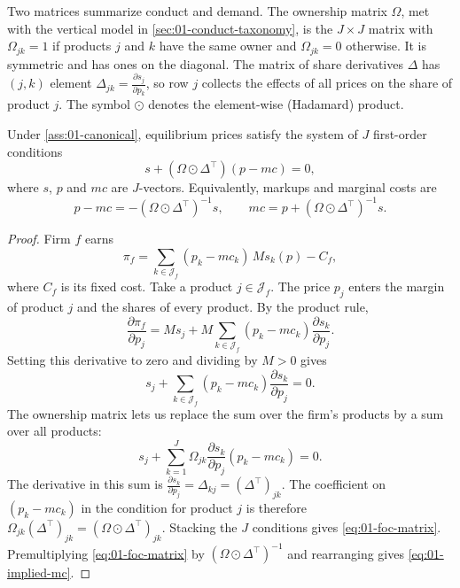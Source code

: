 Two matrices summarize conduct and demand. The ownership matrix $\Omega$, met with the vertical model in
\cref{sec:01-conduct-taxonomy}, is the $J \times J$ matrix with $\Omega_{jk} = 1$ if products $j$ and $k$ have the same owner and $\Omega_{jk} = 0$ otherwise. It is
symmetric and has ones on the diagonal. The matrix of share derivatives $\Delta$ has $(j, k)$ element
$\Delta_{jk} = \frac{\partial s_j}{\partial p_k}$, so row $j$ collects the effects of all prices on the
share of product $j$. The symbol $\odot$ denotes the element-wise (Hadamard) product.

\begin{proposition}\label{prop:01-multiproduct-foc}
Under \cref{ass:01-canonical}, equilibrium prices satisfy the system of $J$ first-order conditions
\begin{equation}\label{eq:01-foc-matrix}
  s + (\Omega \odot \Delta^\top)(p - mc) = 0,
\end{equation}
where $s$, $p$ and $mc$ are $J$-vectors. Equivalently, markups and marginal costs are
\begin{equation}\label{eq:01-implied-mc}
  p - mc = -(\Omega \odot \Delta^\top)^{-1} s,
  \qquad
  mc = p + (\Omega \odot \Delta^\top)^{-1} s .
\end{equation}
\end{proposition}

\begin{proof}
Firm $f$ earns
\[
  \pi_f = \sum_{k \in \mathcal{J}_f} (p_k - mc_k)\, M s_k(p) - C_f ,
\]
where $C_f$ is its fixed cost. Take a product $j \in \mathcal{J}_f$. The price $p_j$ enters the margin of
product $j$ and the shares of every product. By the product rule,
\[
  \frac{\partial \pi_f}{\partial p_j}
  = M s_j + M \sum_{k \in \mathcal{J}_f} (p_k - mc_k) \frac{\partial s_k}{\partial p_j} .
\]
Setting this derivative to zero and dividing by $M > 0$ gives
\[
  s_j + \sum_{k \in \mathcal{J}_f} (p_k - mc_k) \frac{\partial s_k}{\partial p_j} = 0 .
\]
The ownership matrix lets us replace the sum over the firm's products by a sum over all products:
\[
  s_j + \sum_{k = 1}^{J} \Omega_{jk} \frac{\partial s_k}{\partial p_j} (p_k - mc_k) = 0 .
\]
The derivative in this sum is $\frac{\partial s_k}{\partial p_j} = \Delta_{kj} = (\Delta^\top)_{jk}$. The
coefficient on $(p_k - mc_k)$ in the condition for product $j$ is therefore
$\Omega_{jk} (\Delta^\top)_{jk} = (\Omega \odot \Delta^\top)_{jk}$. Stacking the $J$ conditions gives
\eqref{eq:01-foc-matrix}. Premultiplying \eqref{eq:01-foc-matrix} by $(\Omega \odot \Delta^\top)^{-1}$ and
rearranging gives \eqref{eq:01-implied-mc}.
\end{proof}

